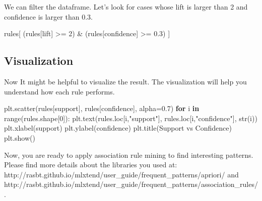 \documentclass[
  letterpaper,
]{scrbook}
\newenvironment{Shaded}{\begin{snugshade}}{\end{snugshade}}
\newcommand{\BuiltInTok}[1]{\textcolor[rgb]{0.00,0.23,0.31}{#1}}
\newcommand{\ControlFlowTok}[1]{\textcolor[rgb]{0.00,0.23,0.31}{\textbf{#1}}}
\newcommand{\DecValTok}[1]{\textcolor[rgb]{0.68,0.00,0.00}{#1}}
\newcommand{\FloatTok}[1]{\textcolor[rgb]{0.68,0.00,0.00}{#1}}
\newcommand{\KeywordTok}[1]{\textcolor[rgb]{0.00,0.23,0.31}{\textbf{#1}}}
\newcommand{\NormalTok}[1]{\textcolor[rgb]{0.00,0.23,0.31}{#1}}
\newcommand{\OperatorTok}[1]{\textcolor[rgb]{0.37,0.37,0.37}{#1}}
\newcommand{\StringTok}[1]{\textcolor[rgb]{0.13,0.47,0.30}{#1}}
\begin{document}
We can filter the dataframe. Let's look for cases whose lift is larger
than 2 and confidence is larger than 0.3.

\begin{Shaded}
\begin{Highlighting}[]
\NormalTok{rules[ (rules[}\StringTok{\textquotesingle{}lift\textquotesingle{}}\NormalTok{] }\OperatorTok{\textgreater{}=} \DecValTok{2}\NormalTok{) }\OperatorTok{\&}\NormalTok{ (rules[}\StringTok{\textquotesingle{}confidence\textquotesingle{}}\NormalTok{] }\OperatorTok{\textgreater{}=} \FloatTok{0.3}\NormalTok{) ]}
\end{Highlighting}
\end{Shaded}

\subsection*{Visualization}\label{visualization}

Now It might be helpful to visualize the result. The visualization will
help you understand how each rule performs.

\begin{Shaded}
\begin{Highlighting}[]
\NormalTok{plt.scatter(rules[}\StringTok{\textquotesingle{}support\textquotesingle{}}\NormalTok{], rules[}\StringTok{\textquotesingle{}confidence\textquotesingle{}}\NormalTok{], alpha}\OperatorTok{=}\FloatTok{0.7}\NormalTok{)}
\ControlFlowTok{for}\NormalTok{ i }\KeywordTok{in} \BuiltInTok{range}\NormalTok{(rules.shape[}\DecValTok{0}\NormalTok{]):}
\NormalTok{    plt.text(rules.loc[i,}\StringTok{"support"}\NormalTok{], rules.loc[i,}\StringTok{"confidence"}\NormalTok{], }\BuiltInTok{str}\NormalTok{(i))}
\NormalTok{plt.xlabel(}\StringTok{\textquotesingle{}support\textquotesingle{}}\NormalTok{)}
\NormalTok{plt.ylabel(}\StringTok{\textquotesingle{}confidence\textquotesingle{}}\NormalTok{)}
\NormalTok{plt.title(}\StringTok{\textquotesingle{}Support vs Confidence\textquotesingle{}}\NormalTok{)}
\NormalTok{plt.show()}
\end{Highlighting}
\end{Shaded}

Now, you are ready to apply association rule mining to find interesting
patterns. Please find more details about the libraries you used at:
http://rasbt.github.io/mlxtend/user\_guide/frequent\_patterns/apriori/
and
http://rasbt.github.io/mlxtend/user\_guide/frequent\_patterns/association\_rules/.
\end{document}
